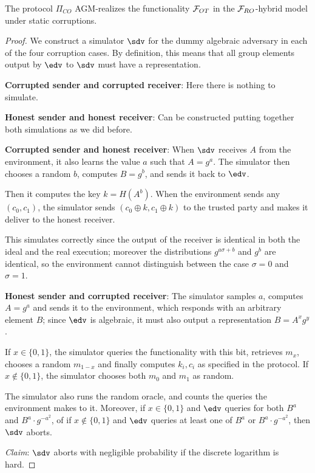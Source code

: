 \begin{theorem}
    The protocol $\Pi_{CO}$ AGM-realizes the functionality $\mathcal{F}_{OT}$ in the $\mathcal{F}_{RO}$-hybrid model under static corruptions.
\end{theorem}
\begin{proof}
    We construct a simulator $\sdv$ for the dummy algebraic adversary in each of the four corruption cases. By definition, this means that all group elements output by $\edv$ to $\sdv$ must have a representation.

    \textbf{Corrupted sender and corrupted receiver}: Here there is nothing to simulate.

    \textbf{Honest sender and honest receiver}: Can be constructed putting together both simulations as we did before.

    \textbf{Corrupted sender and honest receiver}: When $\sdv$ receives $A$ from the environment, it also learns the value $a$ such that $A=g^a$.
    The simulator then chooses a random $b$, computes $B=g^b$, and sends it back to $\edv$.

    Then it computes the key $k=H(A^b)$. When the environment sends any $(c_0,c_1)$, the simulator sends $(c_0\oplus k, c_1\oplus k)$ to the trusted party and makes it deliver to the honest receiver.

    This simulates correctly since the output of the receiver is identical in both the ideal and the real execution; moreover the distributions $g^{a\sigma+b}$ and $g^b$ are identical, so the environment cannot distinguish between the case $\sigma=0$ and $\sigma=1$.

    \textbf{Honest sender and corrupted receiver}: The simulator samples $a$, computes $A=g^a$ and sends it to the environment, which responds with an arbitrary element $B$; since $\edv$ is algebraic, it must also output a representation $B=A^x g^y$.

    If $x\in\{0,1\}$, the simulator queries the functionality with this bit, retrieves $m_x$, chooses a random $m_{1-x}$ and finally computes $k_i,c_i$ as specified in the protocol. If $x\not\in\{0,1\}$, the simulator chooses both $m_0$ and $m_1$ as random.

    The simulator also runs the random oracle, and counts the queries the environment makes to it. Moreover, if $x\in\{0,1\}$ and $\edv$ queries for both $B^a$ and $B^a\cdot g^{-a^2}$, of if $x\not\in\{0,1\}$ and $\edv$ queries at least one of $B^a$ or $B^a\cdot g^{-a^2}$, then $\sdv$ aborts.

    \textit{Claim}: $\sdv$ aborts with negligible probability if the discrete logarithm is hard.


\end{proof}
